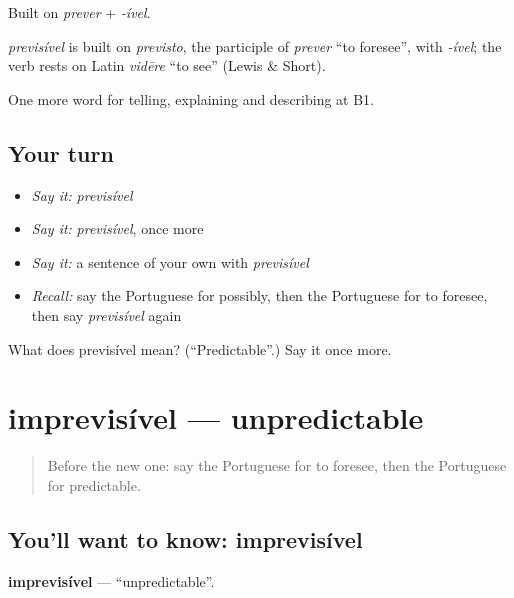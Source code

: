 Built on \emph{prever} + \emph{-ível}.

\begin{cousinweb}
\emph{previsível} is built on \emph{previsto}, the participle of \emph{prever} \textquotedblleft{}to foresee\textquotedblright{}, with \emph{-ível}; the verb rests on Latin \emph{vidēre} \textquotedblleft{}to see\textquotedblright{} (Lewis \& Short).
\end{cousinweb}

\begin{grammarlens}[title={What you've built}]
One more word for telling, explaining and describing at B1.
\end{grammarlens}

\subsection*{Your turn}
\begin{itemize}
\raggedright
  \item \emph{Say it:} \emph{previsível}
  \item \emph{Say it:} \emph{previsível}, once more
  \item \emph{Say it:} a sentence of your own with \emph{previsível}
  \item \emph{Recall:} say the Portuguese for possibly, then the Portuguese for to foresee, then say \emph{previsível} again
\end{itemize}

\begin{tcolorbox}[breakable,colback=teal!4,colframe=teal!35!black,title={Before you move on}]
What does previsível mean? (\textquotedblleft{}Predictable\textquotedblright{}.) Say it once more.
\end{tcolorbox}
\section[imprevisível]{imprevisível — unpredictable}

\label{lesson:PT-C371-imprevisivel}



\begin{quote}
Before the new one: say the Portuguese for to foresee, then the Portuguese for predictable.
\end{quote}

\subsection*{You'll want to know: imprevisível}
\textbf{imprevisível} — \textquotedblleft{}unpredictable\textquotedblright{}.

